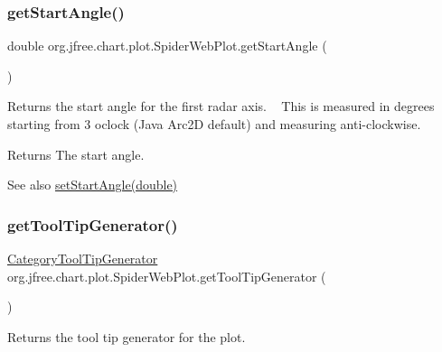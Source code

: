 \subsubsection{\texorpdfstring{get\+Start\+Angle()}{getStartAngle()}}
{\footnotesize\ttfamily double org.\+jfree.\+chart.\+plot.\+Spider\+Web\+Plot.\+get\+Start\+Angle (\begin{DoxyParamCaption}{ }\end{DoxyParamCaption})}

Returns the start angle for the first radar axis. ~\newline
 This is measured in degrees starting from 3 o\textquotesingle{}clock (Java Arc2D default) and measuring anti-\/clockwise.

\begin{DoxyReturn}{Returns}
The start angle.
\end{DoxyReturn}
\begin{DoxySeeAlso}{See also}
\mbox{\hyperlink{classorg_1_1jfree_1_1chart_1_1plot_1_1_spider_web_plot_afbc698066d679042f63a1010a0e4f7d0}{set\+Start\+Angle(double)}} 
\end{DoxySeeAlso}
\mbox{\label{classorg_1_1jfree_1_1chart_1_1plot_1_1_spider_web_plot_a265ccacbd0b27a4f909fcbd07e58303b}} 
\subsubsection{\texorpdfstring{get\+Tool\+Tip\+Generator()}{getToolTipGenerator()}}
{\footnotesize\ttfamily \mbox{\hyperlink{interfaceorg_1_1jfree_1_1chart_1_1labels_1_1_category_tool_tip_generator}{Category\+Tool\+Tip\+Generator}} org.\+jfree.\+chart.\+plot.\+Spider\+Web\+Plot.\+get\+Tool\+Tip\+Generator (\begin{DoxyParamCaption}{ }\end{DoxyParamCaption})}

Returns the tool tip generator for the plot.


